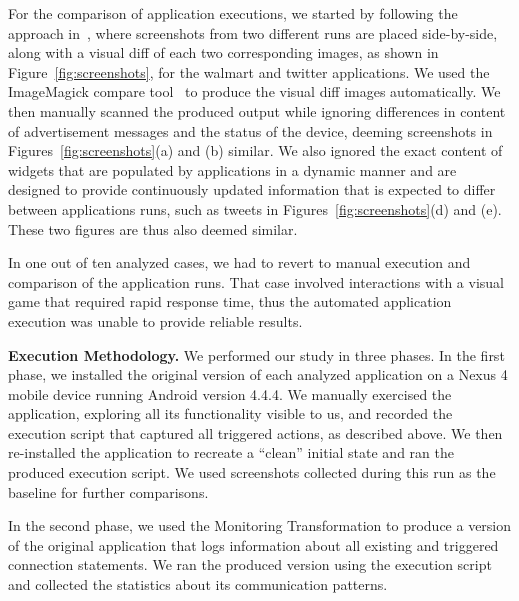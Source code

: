 For the comparison of application executions, we started by following the approach in~\cite{Hornyack:Han:Jung:Schechter:Wetherall:CCS11}, where screenshots from two different runs are placed side-by-side, 
along with a visual diff of each two corresponding images, as shown in Figure~\ref{fig:screenshots}, for 
the walmart and twitter applications. 
We used the ImageMagick compare tool~\cite{imagemagick}
to produce the visual diff images automatically. 
We then manually scanned the produced output while ignoring differences in content of advertisement messages and the status of the device, deeming screenshots in Figures~\ref{fig:screenshots}(a) and (b) similar. 
We also ignored the exact content of widgets that are populated by applications in a dynamic manner and are designed to 
provide continuously updated information that is expected to differ between applications runs, such as tweets in Figures~\ref{fig:screenshots}(d) and (e). These two figures are thus also deemed similar.

In one out of ten analyzed cases, we had to revert to manual execution and comparison of the application runs.
That case involved interactions with a visual game that required rapid response time, 
thus the automated application execution was unable to provide reliable results. 


\vspace{0.1in}
\noindent 
{\bf Execution Methodology.}
We performed our study in three phases. In the first phase, we installed the original version of each analyzed 
application on a Nexus 4 mobile device running Android version 4.4.4.
We manually exercised the application, exploring all its functionality visible to us, and recorded the execution script that captured all triggered actions, as described above. 
We then re-installed the application to recreate a ``clean'' initial state and ran the produced execution script.  
We used screenshots collected during this run as the baseline for further comparisons. 

In the second phase, we used the Monitoring Transformation to produce a version of the original application that logs information about all existing and triggered connection statements. We ran the produced version using the execution script and collected the statistics about its communication patterns.  

